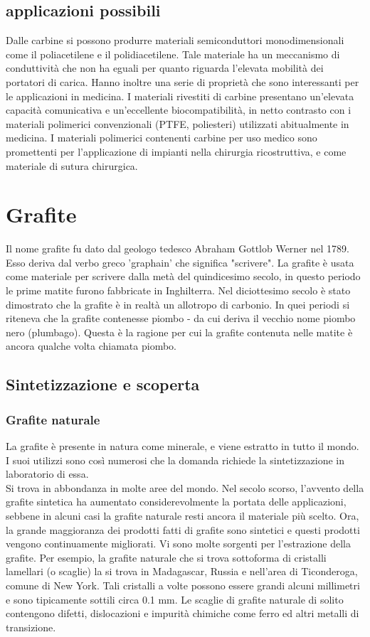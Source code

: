 \documentclass[a4paper,titlepage]{book}
\begin{document}
 \section{applicazioni possibili}
Dalle carbine si possono produrre materiali semiconduttori monodimensionali come il poliacetilene e il polidiacetilene. Tale materiale ha un meccanismo di conduttività che non ha eguali per quanto riguarda l'elevata mobilità dei portatori di carica.
Hanno inoltre una serie di proprietà che sono interessanti per le applicazioni in medicina. I materiali rivestiti di carbine presentano un'elevata capacità comunicativa e un'eccellente biocompatibilità, in netto contrasto con i materiali polimerici convenzionali (PTFE, poliesteri) utilizzati abitualmente in medicina. I materiali polimerici contenenti carbine per uso medico sono promettenti per l'applicazione di impianti nella chirurgia ricostruttiva, e come materiale di sutura chirurgica.

\chapter{Grafite}
Il nome grafite fu dato dal geologo tedesco  Abraham Gottlob Werner nel 1789. Esso deriva dal verbo greco 'graphain' che significa "scrivere". La grafite è usata come materiale per scrivere dalla metà del quindicesimo secolo, in questo periodo le prime matite furono fabbricate in Inghilterra. Nel diciottesimo secolo è stato dimostrato che la grafite è in realtà un allotropo di carbonio. In quei periodi si riteneva che la grafite contenesse piombo - da cui deriva il vecchio nome piombo nero (plumbago). Questa è la ragione per cui la grafite contenuta nelle matite  è ancora qualche volta chiamata piombo. 

\section{Sintetizzazione e scoperta}
\subsection{Grafite naturale}
La grafite è presente in natura come minerale, e viene estratto in tutto il mondo. I suoi utilizzi sono così numerosi che la domanda richiede la sintetizzazione in laboratorio di essa.\\
Si trova in abbondanza in molte aree del mondo. Nel secolo scorso, l'avvento della grafite sintetica ha aumentato considerevolmente la portata delle applicazioni, sebbene in alcuni casi la grafite naturale resti ancora il materiale più scelto. Ora, la grande maggioranza dei prodotti fatti di grafite sono sintetici e questi prodotti vengono continuamente migliorati.
Vi sono molte sorgenti per l'estrazione della grafite. Per esempio, la grafite naturale che si trova sottoforma di cristalli lamellari (o scaglie) la si trova in Madagascar, Russia e nell'area di Ticonderoga, comune di New York. Tali cristalli a volte possono essere grandi alcuni millimetri e sono tipicamente sottili circa 0.1 mm. Le scaglie di grafite naturale di solito contengono difetti, dislocazioni e impurità chimiche come ferro ed altri metalli di transizione. 
\end{document}
